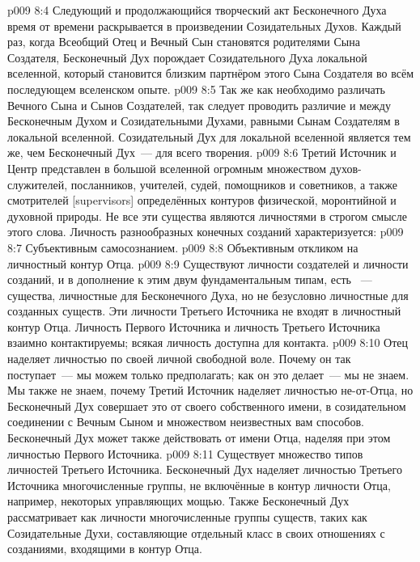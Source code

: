 \vs p009 8:4 Следующий и продолжающийся творческий акт Бесконечного Духа время от времени раскрывается в произведении Созидательных Духов. Каждый раз, когда Всеобщий Отец и Вечный Сын становятся родителями Сына Создателя, Бесконечный Дух порождает Созидательного Духа локальной вселенной, который становится близким партнёром этого Сына Создателя во всём последующем вселенском опыте.
\vs p009 8:5 Так же как необходимо различать Вечного Сына и Сынов Создателей, так следует проводить различие и между Бесконечным Духом и Созидательными Духами, равными Сынам Создателям в локальной вселенной. Созидательный Дух для локальной вселенной является тем же, чем Бесконечный Дух~--- для всего творения.
\vs p009 8:6 \pc Третий Источник и Центр представлен в большой вселенной огромным множеством духов\hyp{}служителей, посланников, учителей, судей, помощников и советников, а также смотрителей [supervisors] определённых контуров физической, моронтийной и духовной природы. Не все эти существа являются личностями в строгом смысле этого слова. Личность разнообразных конечных созданий характеризуется:
\vs p009 8:7 Субъективным самосознанием.
\vs p009 8:8 Объективным откликом на личностный контур Отца.
\vs p009 8:9 \pc Существуют личности создателей и личности созданий, и в дополнение к этим двум фундаментальным типам, есть ~--- существа, личностные для Бесконечного Духа, но не безусловно личностные для созданных существ. Эти личности Третьего Источника не входят в личностный контур Отца. Личность Первого Источника и личность Третьего Источника взаимно контактируемы; всякая личность доступна для контакта.
\vs p009 8:10 \pc Отец наделяет личностью по своей личной свободной воле. Почему он так поступает~--- мы можем только предполагать; как он это делает~--- мы не знаем. Мы также не знаем, почему Третий Источник наделяет личностью не\hyp{}от\hyp{}Отца, но Бесконечный Дух совершает это от своего собственного имени, в созидательном соединении с Вечным Сыном и множеством неизвестных вам способов. Бесконечный Дух может также действовать от имени Отца, наделяя при этом личностью Первого Источника.
\vs p009 8:11 \pc Существует множество типов личностей Третьего Источника. Бесконечный Дух наделяет личностью Третьего Источника многочисленные группы, не включённые в контур личности Отца, например, некоторых управляющих мощью. Также Бесконечный Дух рассматривает как личности многочисленные группы существ, таких как Созидательные Духи, составляющие отдельный класс в своих отношениях с созданиями, входящими в контур Отца.

